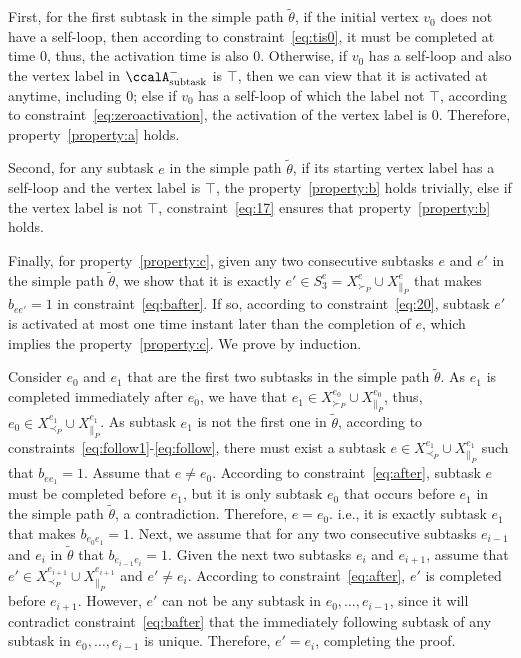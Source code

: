 \documentclass[Afour,sageh,times]{sagej}
\newcommand{\auto}[1]{\ccalA_{\textup{#1}}}
\begin{document}
{First, for the first subtask in the simple path $\tilde{\theta}$, if the initial vertex $v_0$ does not have a self-loop, then according to constraint~\eqref{eq:tis0}, it must be completed at time 0, thus, the activation time is also 0. Otherwise, if $v_0$ has a self-loop and also the vertex label in $\auto{subtask}^-$ is $\top$, then we can view that it is activated at anytime, including 0; else if $v_0$ has a self-loop of which the  label  not $\top$, according to constraint~\eqref{eq:zeroactivation}, the activation of the vertex label is 0. Therefore, property~\ref{property:a} holds.

Second, for any subtask $e$ in the simple path $\tilde{\theta}$, if its starting vertex label has a self-loop and the vertex label is $\top$, the property~\ref{property:b} holds trivially, else if the vertex label is not $\top$,  constraint~\eqref{eq:17} ensures that  property~\ref{property:b} holds.

Finally,  for  property~\ref{property:c}, given any two consecutive subtasks $e$ and $e'$ in the simple path $\tilde{\theta}$, we show that it is exactly $e' \in S_3^e = X^e_{\succ_{P}} \cup X^e_{\|_{P}}$ that makes $b_{ee'}=1$ in constraint~\eqref{eq:bafter}. If so, according to constraint~\eqref{eq:20}, subtask $e'$ is activated at most one time instant later than the completion of $e$, which implies the property~\ref{property:c}. We prove by induction.

Consider $e_0$ and $e_1$ that are the first two subtasks in the simple path $\tilde{\theta}$. As $e_1$ is completed immediately after $e_0$, we have that $e_1\in X^{e_0}_{\succ_{P}} \cup X^{e_0}_{\|_{P}} $, thus, ${e_0} \in X^{e_1}_{\prec_{P}} \cup X^{e_1}_{\|_{P}}$. As subtask $e_1$ is not the first one in $\tilde{\theta}$, according to constraints~\eqref{eq:follow1}-\eqref{eq:follow}, there must exist  a subtask $e \in X^{e_1}_{\prec_{P}} \cup X^{e_1}_{\|_{P}} $ such that $b_{e e_1}=1$. Assume that $e \neq e_0$. According to constraint~\eqref{eq:after}, subtask $e$ must be completed before $e_1$, but it is only subtask $e_0$ that occurs before $e_1$ in the simple path $\tilde{\theta}$, a contradiction. Therefore, $e  = e_0$. i.e., it is exactly subtask $e_1$ that makes $b_{e_0 e_1}=1$. Next, we assume that for any two consecutive subtasks $e_{i-1}$ and $e_{i}$ in $\tilde{\theta}$ that $b_{e_{i-1} e_i} = 1$. Given the next two subtasks $e_{i}$ and $e_{i+1}$, assume that $e' \in X^{e_{i+1}}_{\prec_{P}} \cup X^{e_{i+1}}_{\|_{P}}$ and $e' \neq e_i$. According to constraint~\eqref{eq:after}, $e'$ is completed before $e_{i+1}$. However, $e'$ can not be any subtask in $e_0, \ldots, e_{i-1}$, since it will contradict constraint~\eqref{eq:bafter} that the immediately following subtask of any subtask in $e_0, \ldots, e_{i-1}$ is unique. Therefore, $e' = e_i$, completing the proof.




}
\end{document}
